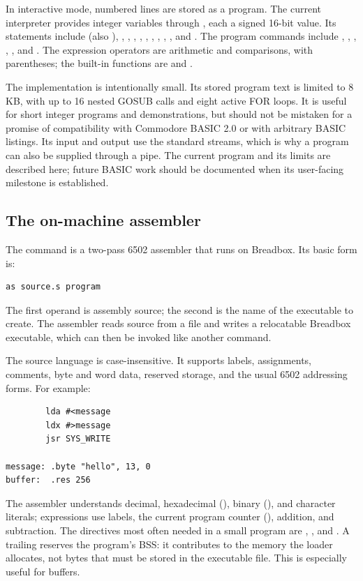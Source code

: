 In interactive mode, numbered lines are stored as a program. The current interpreter provides integer variables  through , each a signed 16-bit value. Its statements include  (also ), , , , , , , , , , and . The program commands include , , , , , and . The expression operators are arithmetic and comparisons, with parentheses; the built-in functions are  and .

The implementation is intentionally small. Its stored program text is limited to 8 KB, with up to 16 nested GOSUB calls and eight active FOR loops. It is useful for short integer programs and demonstrations, but should not be mistaken for a promise of compatibility with Commodore BASIC 2.0 or with arbitrary BASIC listings. Its input and output use the standard streams, which is why a program can also be supplied through a pipe. The current program and its limits are described here; future BASIC work should be documented when its user-facing milestone is established.

\subsection{The on-machine assembler}

The  command is a two-pass 6502 assembler that runs on Breadbox. Its basic form is:

\begin{lstlisting}
as source.s program
\end{lstlisting}

The first operand is assembly source; the second is the name of the executable to create. The assembler reads source from a file and writes a relocatable Breadbox executable, which can then be invoked like another command.

The source language is case-insensitive. It supports labels, assignments, comments, byte and word data, reserved storage, and the usual 6502 addressing forms. For example:

\begin{lstlisting}
        lda #<message
        ldx #>message
        jsr SYS_WRITE

message: .byte "hello", 13, 0
buffer:  .res 256
\end{lstlisting}

The assembler understands decimal, hexadecimal (), binary (), and character literals; expressions use labels, the current program counter (\cmd{*}), addition, and subtraction. The directives most often needed in a small program are , , and . A trailing  reserves the program's BSS: it contributes to the memory the loader allocates, not bytes that must be stored in the executable file. This is especially useful for buffers.

